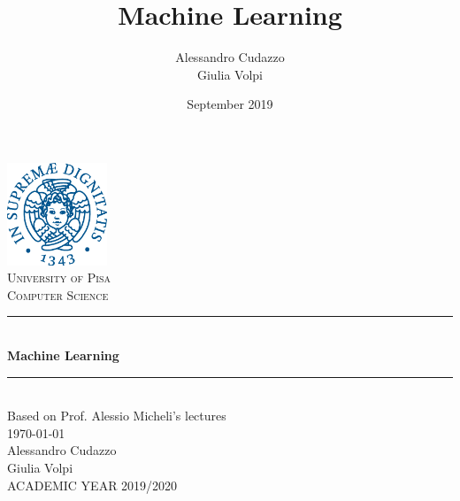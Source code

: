 \documentclass{article}
\title{Machine Learning}
\author{Alessandro Cudazzo\\ Giulia Volpi}
\date{September 2019}
\theoremstyle{definition}
\theoremstyle{remark}
\begin{document}
\def\thesistitle{Machine Learning}
\def\thesisauthorfirst{Alessandro Cudazzo}
\def\thesisauthorsecond{Giulia Volpi}
\def\thesisdate{\today}
\def\theacademicyeas{ACADEMIC YEAR 2019/2020}


\begin{titlepage}
	\newcommand{\HRule}{\rule{\linewidth}{0.5mm}}
	\center

	\includegraphics[width=30mm]{Figure/cherubino_pant541.eps}\\[0.9cm]
	\textsc{\Large University of Pisa}\\[0.3cm]
	\textsc{\Large Computer Science}\\[0.6cm]
	\HRule \\[0.6cm]
	{ \LARGE \bfseries \thesistitle}\\[0.3cm]
	\HRule \\[0.6cm]
	{\large Based on Prof. Alessio Micheli's lectures}\\[0.6cm]
	{\large \thesisdate}\\[2.7cm]
    {\Large \thesisauthorfirst \\ \vspace{0.6cm} \thesisauthorsecond}\\[4cm]
    \vspace*{\fill}
	{\large \theacademicyeas}\\
	\clearpage
\end{titlepage}
\clearpage
\clearpage\mbox{}\thispagestyle{empty}\clearpage\setcounter{page}{1}
\end{document}

